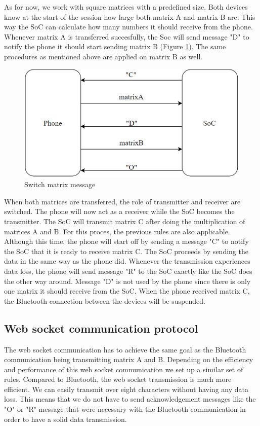 \documentclass[a4paper, 11pt]{report}
\begin{document}
As for now, we work with square matrices with a predefined size. Both devices know at the start of the session how large both matrix A and matrix B are. This way the SoC can calculate how many numbers it should receive from the phone. Whenever matrix A is transferred succesfully, the Soc will send message "D" to notify the phone it should start sending matrix B (Figure \ref{fig:shiftMatrix}). The same procedures as mentioned above are applied on matrix B as well.

\begin{figure}[ht]
\centering
\includegraphics[scale=0.7]{images/ShiftMatrix.pdf}
\caption{Switch matrix message}\label{fig:shiftMatrix}
\end{figure}

When both matrices are transferred, the role of transmitter and receiver are switched. The phone will now act as a receiver while the SoC becomes the transmitter. The SoC will transmit matrix C after doing the multiplication of matrices A and B. For this proces, the previous rules are also applicable. Although this time, the phone will start off by sending a message "C" to notify the SoC that it is ready to receive matrix C. The SoC proceeds by sending the data in the same way as the phone did. Whenever the transmission experiences data loss, the phone will send message "R" to the SoC exactly like the SoC does the other way around.
Message "D" is not used by the phone since there is only one matrix it should receive from the SoC. When the phone received matrix C, the Bluetooth connection between the devices will be suspended.

	\subsection{Web socket communication protocol}\label{subsec:websocketProtocol}
The web socket communication has to achieve the same goal as the Bluetooth communication being transmitting matrix A and B. Depending on the efficiency and performance of this web socket communication we set up a similar set of rules. Compared to Bluetooth, the web socket transmission is much more efficient. We can easily transmit over eight characters without having any data loss. This means that we do not have to send acknowledgement messages like the "O" or "R" message that were necessary with the Bluetooth communication in order to have a solid data transmission.
\end{document}
